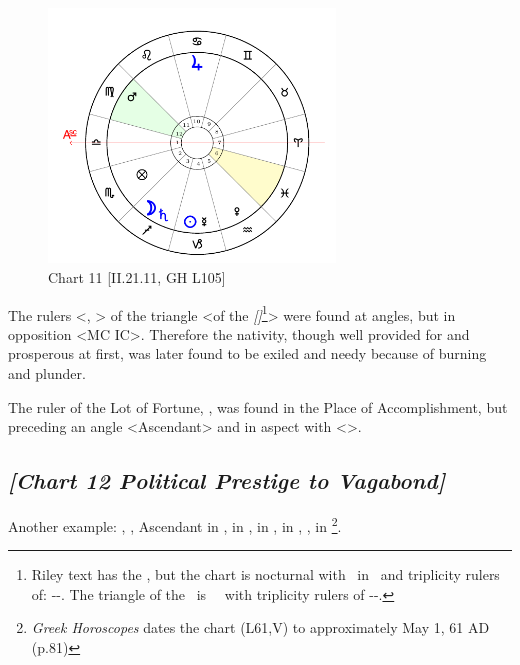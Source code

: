 \clearpage
\begin{figure}
\centering
\vspace{-20pt}
\includegraphics[width=0.68\textwidth]{charts/2_21_11}
\caption{Chart 11 [II.21.11, GH L105]}
\label{fig:chart11}
\end{figure}

The rulers <\Jupiter, \Sun> of the triangle <of the \textsl{[\Moon]}\footnote{Riley text has the \Sun, but the chart is nocturnal with \Moon\, in \Sagittarius\, and triplicity rulers of: \Sun-\Jupiter-\Saturn. The triangle of the \Sun\, is \Taurus\, \Virgo\, \Capricorn with triplicity rulers of \Venus-\Moon-\Mars.}> were found at angles, but in opposition <MC IC>. Therefore the nativity, though well provided for and prosperous at first, was later found to be exiled and needy because of burning and plunder. 

The ruler of the Lot of Fortune, \Mars, was found in the Place of Accomplishment, but preceding an angle <Ascendant> and in aspect with \Saturn <\Square>.

\newpage
\subsection*{\textit{[Chart 12 Political Prestige to Vagabond]}}

Another example: \Sun, \Venus, Ascendant in \Taurus, \Moon\xspace in \Aquarius, \Saturn\xspace in \Cancer, \Jupiter\xspace in \Libra, \Mars, \Mercury\xspace in \Gemini
\footnote{\textit{Greek Horoscopes} dates the chart (L61,V) to approximately May 1, 61 AD (p.81)}.

